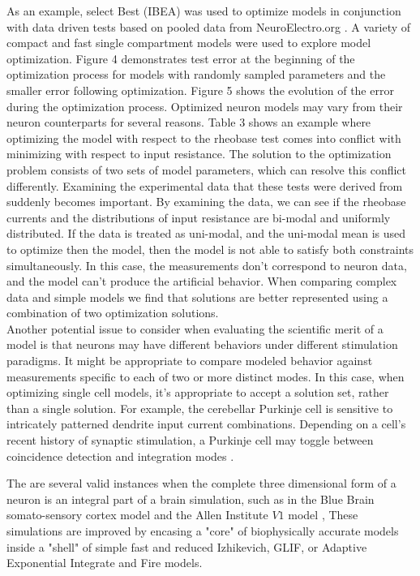 As an example, select Best (IBEA) was used to optimize models in conjunction with data driven tests based on pooled data from NeuroElectro.org \cite{tripathy2014neuroelectro}. A variety of compact and fast single compartment models were used to explore model optimization. Figure 4 demonstrates test error at the beginning of the optimization process for models with randomly sampled parameters and the smaller error following optimization. Figure 5 shows the evolution of the error during the optimization process. \newline
\newline
Optimized neuron models may vary from their neuron counterparts for several reasons. Table 3 shows an example where optimizing the model with respect to the rheobase test comes into conflict with minimizing with respect to input resistance. The solution to the optimization problem consists of two sets of model parameters, which can resolve this conflict differently. Examining the experimental data that these tests were derived from suddenly becomes important. By examining the data, we can see if the rheobase currents and the distributions of input resistance are bi-modal and uniformly distributed. If the data is treated as uni-modal, and the uni-modal mean is used to optimize then the model, then the model is not able to satisfy both constraints simultaneously. In this case, the measurements don’t correspond to neuron data, and the model can’t produce the artificial behavior. When comparing complex data and simple models we find that solutions are better represented using a combination of two optimization solutions.\\

Another potential issue to consider when evaluating the scientific merit of a model is that neurons may have different behaviors under different stimulation paradigms. It might be appropriate to compare modeled behavior against measurements specific to each of two or more distinct modes. In this case, when optimizing single cell models, it’s appropriate to accept a solution set, rather than a single solution. For example, the cerebellar Purkinje cell is sensitive to intricately patterned dendrite input current combinations. Depending on a cell’s recent history of synaptic stimulation, a Purkinje cell may toggle between coincidence detection and integration modes \cite{ratte2013impact}.

The are several valid instances when the complete three dimensional form of a neuron is an integral part of a brain simulation, such as in the Blue Brain somato-sensory cortex model \cite{markram2006blue} and the Allen Institute $V1$ model \cite{billeh2020systematic}, These simulations are improved by encasing a "core" of biophysically accurate models inside a "shell" of simple fast and reduced Izhikevich, GLIF, or Adaptive Exponential Integrate and Fire models.\\ 

